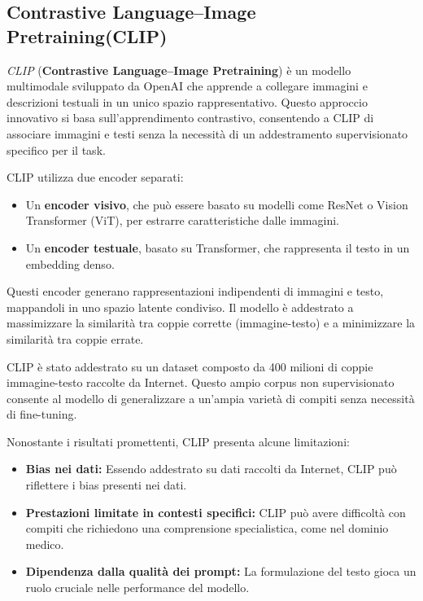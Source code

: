 \documentclass[../main.tex]{subfiles}
\begin{document}
\subsection{Contrastive Language–Image Pretraining(CLIP)}

\textit{CLIP} (\textbf{Contrastive Language–Image Pretraining}) \cite{radford2021learningtransferablevisualmodels} è un modello multimodale sviluppato da OpenAI che apprende a collegare immagini e descrizioni testuali in un unico spazio rappresentativo. Questo approccio innovativo si basa sull'apprendimento contrastivo, consentendo a CLIP di associare immagini e testi senza la necessità di un addestramento supervisionato specifico per il task.

CLIP utilizza due encoder separati:
\begin{itemize}
    \item Un \textbf{encoder visivo}, che può essere basato su modelli come ResNet o Vision Transformer (ViT), per estrarre caratteristiche dalle immagini.
    \item Un \textbf{encoder testuale}, basato su Transformer, che rappresenta il testo in un embedding denso.
\end{itemize}
Questi encoder generano rappresentazioni indipendenti di immagini e testo, mappandoli in uno spazio latente condiviso. Il modello è addestrato a massimizzare la similarità tra coppie corrette (immagine-testo) e a minimizzare la similarità tra coppie errate.

CLIP è stato addestrato su un dataset composto da 400 milioni di coppie immagine-testo raccolte da Internet. Questo ampio corpus non supervisionato consente al modello di generalizzare a un'ampia varietà di compiti senza necessità di fine-tuning.

Nonostante i risultati promettenti, CLIP presenta alcune limitazioni:
\begin{itemize}
    \item \textbf{Bias nei dati:} Essendo addestrato su dati raccolti da Internet, CLIP può riflettere i bias presenti nei dati.
    \item \textbf{Prestazioni limitate in contesti specifici:} CLIP può avere difficoltà con compiti che richiedono una comprensione specialistica, come nel dominio medico.
    \item \textbf{Dipendenza dalla qualità dei prompt:} La formulazione del testo gioca un ruolo cruciale nelle performance del modello.
\end{itemize}
\end{document}
